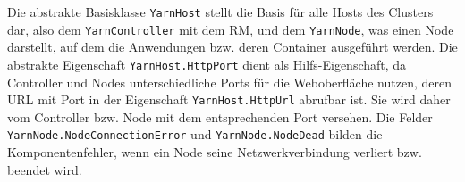 Die abstrakte Basisklasse \texttt{YarnHost} stellt die Basis für alle Hosts des Clusters dar, also dem \texttt{YarnController} mit dem \ac{RM}, und dem \texttt{YarnNode}, was einen Node darstellt, auf dem die Anwendungen bzw. deren Container ausgeführt werden. Die abstrakte Eigenschaft \texttt{YarnHost.HttpPort} dient als Hilfs-Eigenschaft, da Controller und Nodes unterschiedliche Ports für die Weboberfläche nutzen, deren URL mit Port in der Eigenschaft \texttt{YarnHost.HttpUrl} abrufbar ist. Sie wird daher vom Controller bzw. Node mit dem entsprechenden Port versehen. Die Felder \texttt{YarnNode.NodeConnectionError} und \texttt{YarnNode.NodeDead} bilden die Komponentenfehler, wenn ein Node seine Netzwerkverbindung verliert bzw. beendet wird.

